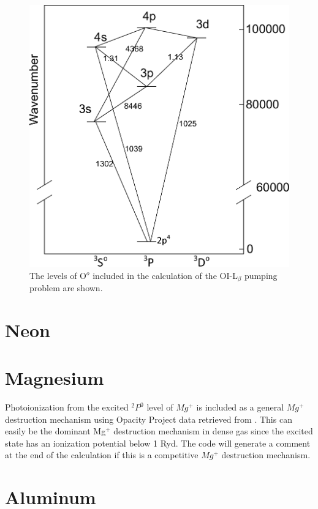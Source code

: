 \begin{figure}
\centering
\includegraphics[scale=0.8]{OI_EnergyLevels}
\caption[O~I energy levels]{The levels of O$^o$ included in the calculation of the
OI-L$_{\beta}$ pumping
problem are shown.}
\label{fig:OI_EnergyLevels}
\end{figure}

\section{Neon}


\section{Magnesium}

Photoionization from the excited $^2P^0$ level of $Mg^+$ is included as a general
$Mg^+$ destruction mechanism using Opacity Project data retrieved from
.
This can easily be the dominant Mg$^+$ destruction mechanism in
dense gas
since the excited state has an ionization potential below 1 Ryd.  The code
will generate a comment at the end of the calculation if this is a
competitive $Mg^+$ destruction mechanism.

\section{Aluminum}


